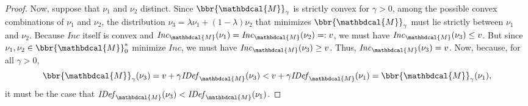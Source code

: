 \documentclass[letterpaper]{article} %
\theoremstyle{plain}
\theoremstyle{definition}
\theoremstyle{remark}
\newcommand{\dg}[1]{\mathbdcal{#1}}
\newcommand{\IDef}[1]{\mathit{IDef}_{#1}}
\newcommand\Inc{\mathit{Inc}}
\begin{document}
\begin{proof}
Now, suppose that $\nu_1$ and $\nu_2$ distinct. Since $\bbr{\dg M}_\gamma$
is strictly convex for $\gamma > 0$, among the possible convex
combinations of $\nu_1$ and $\nu_2$, the distribution $\nu_3 = \lambda
\nu_1 + (1-\lambda) \nu_2$ that minimizes $\bbr{\dg M}_\gamma$ must
lie strictly between $\nu_1$ and $\nu_2$. 
Because $\Inc$ itself is convex and $\Inc_{\dg M}(\nu_1) = \Inc_{\dg
  M}(\nu_2) =: v$, we must have $\Inc_{\dg M}(\nu_3) \le v$. 
But since
$\nu_1,\nu_2 \in \bbr{\dg M}_0^*$ minimize $\Inc$,
we must have $\Inc_{\dg M}(\nu_3) \ge v$.
Thus, $\Inc_{\dg M}(\nu_3) = v$. 
Now, because, for all  $\gamma > 0$,
\[ \bbr{\dg M}_\gamma(\nu_3) = v + \gamma \IDef{\dg M}(\nu_3) 
 	< v + \gamma \IDef{\dg M}(\nu_1) = \bbr{\dg M}_\gamma(\nu_1), \] 
it must be the case that $\IDef{\dg M}(\nu_3) < \IDef{\dg M}(\nu_1)$. 
        

\end{proof}
\end{document}
